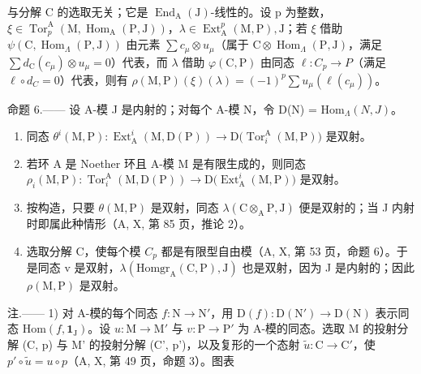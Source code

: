 与分解 C 的选取无关；它是 \(\operatorname{End}_{\mathrm{A}}(\mathrm{J})\)-线性的。设 p 为整数，\(\xi \in \operatorname{Tor}_{p}^{\mathrm{A}}(\mathrm{M}, \operatorname{Hom}_{\mathrm{A}}(\mathrm{P}, \mathrm{J}))\)，\(\lambda \in \operatorname{Ext}_{\mathrm{A}}^{p}(\mathrm{M}, \mathrm{P}), \mathrm{J}\)；若 \(\xi\) 借助 \(\psi(\mathrm{C}, \operatorname{Hom}_{\Lambda}(\mathrm{P}, \mathrm{J}))\) 由元素 \(\sum c_{\mu} \otimes u_{\mu}\)（属于 \(\mathrm{C} \otimes \operatorname{Hom}_{\Lambda}(\mathrm{P}, \mathrm{J})\)，满足 \(\sum d_{\mathrm{C}}(c_{\mu}) \otimes u_{\mu} = 0\)）代表，而 \(\lambda\) 借助 \(\varphi(\mathrm{C}, \mathrm{P})\) 由同态 \(\ell : C_{p} \to P\)（满足 \(\ell \circ d_{C} = 0\)）代表，则有 \(\rho(\mathrm{M}, \mathrm{P})(\xi)(\lambda) = (-1)^{p} \sum u_{\mu} (\ell(c_{\mu}))\)。

命题 6.—— 设 A-模 J 是内射的；对每个 A-模 N，令 D(N) = \(\mathrm{Hom}_{\Lambda}(N,J)\)。

\begin{enumerate}
\def\labelenumi{\alph{enumi})}
\item
  同态 \(\theta^{i}(\mathrm{M},\mathrm{P}):\operatorname{Ext}_{\mathrm{A}}^{i}(\mathrm{M},\mathrm{D}(\mathrm{P}))\longrightarrow \mathrm{D}\big(\operatorname {Tor}_{i}^{\mathrm{A}}(\mathrm{M},\mathrm{P})\big)\) 是双射。
\item
  若环 A 是 Noether 环且 A-模 M 是有限生成的，则同态 \(\rho_{i}(\mathrm{M},\mathrm{P}):\operatorname{Tor}_{i}^{\mathrm{A}}(\mathrm{M},\mathrm{D}(\mathrm{P}))\longrightarrow \mathrm{D}\bigl (\operatorname {Ext}_{\mathrm{A}}^{i}(\mathrm{M},\mathrm{P})\bigr)\) 是双射。
\item
  按构造，只要 \(\theta(\mathrm{M},\mathrm{P})\) 是双射，同态 \(\lambda(\mathrm{C}\otimes_{\mathrm{A}}\mathrm{P},\mathrm{J})\) 便是双射的；当 J 内射时即属此种情形（A, X, 第 85 页，推论 2）。
\item
  选取分解 C，使每个模 \(C_{p}\) 都是有限型自由模（A, X, 第 53 页，命题 6）。于是同态 v 是双射，\(\lambda(\text{Homgr}_{\text{A}}(\text{C}, \text{P}), \text{J})\) 也是双射，因为 J 是内射的；因此 \(\rho(\text{M}, \text{P})\) 是双射。
\end{enumerate}

注.—— 1) 对 A-模的每个同态 \(f: \mathrm{N} \to \mathrm{N}'\)，用 \(\mathrm{D}(f): \mathrm{D}(\mathrm{N}') \to \mathrm{D}(\mathrm{N})\) 表示同态 \(\mathrm{Hom}(f, \mathbf{1}_{\mathrm{J}})\)。设 \(u: \mathrm{M} \to \mathrm{M}'\) 与 \(v: \mathrm{P} \to \mathrm{P}'\) 为 A-模的同态。选取 M 的投射分解 (C, p) 与 M' 的投射分解 (C', p')，以及复形的一个态射 \(\tilde{u}: \mathrm{C} \to \mathrm{C}'\)，使 \(p' \circ \tilde{u} = u \circ p\)（A, X, 第 49 页，命题 3）。图表

